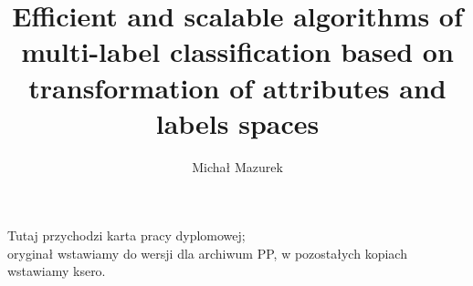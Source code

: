 \documentclass[english,a4paper,oneside]{ppfcmthesis}
\author{Michał Mazurek}
\title{Efficient and scalable algorithms of multi-label classification based on transformation of attributes and labels spaces}
\begin{document}
\frontmatter\pagestyle{empty}%
\maketitle\cleardoublepage%

\thispagestyle{empty}\vspace*{\fill}%
\begin{center}Tutaj przychodzi karta pracy dyplomowej;\\oryginał wstawiamy do wersji dla archiwum PP, w pozostałych kopiach wstawiamy ksero.\end{center}%
\vfill\cleardoublepage%

\pagestyle{ppfcmthesis}%





\tableofcontents* \cleardoublepage%

\cleardoublepage
\listoffigures

\cleardoublepage
\listoftables


\mainmatter%






\cleardoublepage\appendix%
%

{\raggedright\sloppy\small}

\ppcolophon
\end{document}
